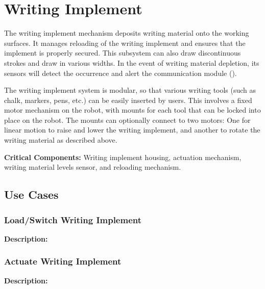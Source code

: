 
\section{Writing Implement}
\label{sec:writing_implement}
The writing implement mechanism deposits writing material onto the working surfaces. It manages reloading of the writing implement and ensures that the implement is properly secured. This subsystem can also draw discontinuous  strokes and draw in various widths. In the event of writing material depletion, its sensors will detect the occurrence and alert the communication module (). 

The writing implement system is modular, so that various writing tools (such as chalk, markers, pens, etc.) can be easily inserted by users. This involves a fixed motor mechanism on the robot, with mounts for each tool that can be locked into place on the robot. The mounts can optionally connect to two motors: One for linear motion to raise and lower the writing implement, and another to rotate the writing material as described above.

\noindent
\textbf{Critical Components:} Writing implement housing, actuation mechanism, writing material levels sensor, and reloading mechanism. 


\subsection{Use Cases}

\subsubsection{Load/Switch Writing Implement}
\textbf{Description:} 

\subsubsection{Actuate Writing Implement}
\textbf{Description:} 

